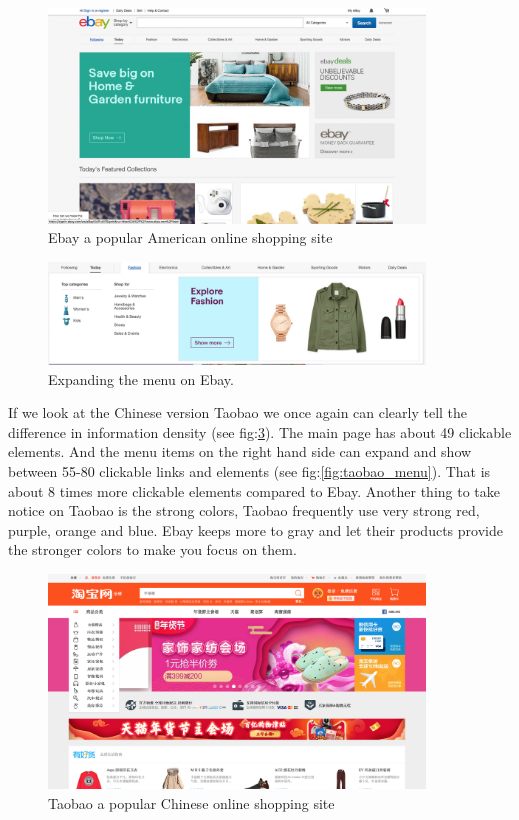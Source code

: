 \begin{figure}[h]
\centering
\includegraphics[width=100mm]{Images/ebay.png}
\decoRule
\caption[ebay]{Ebay a popular American online shopping site}
\label{fig:ebay}
\end{figure}

\begin{figure}[h]
\centering
\includegraphics[width=100mm]{Images/ebay_menu.png}
\decoRule
\caption[Ebay's menu bar]{Expanding the menu on Ebay.}
\label{fig:ebay_menu}
\end{figure}

If we look at the Chinese version Taobao we once again can clearly tell the difference in information density (see fig:\ref{fig:taobao}). The main page has about 49 clickable elements. And the menu items on the right hand side can expand and show between 55-80 clickable links and elements (see fig:\ref{fig:taobao_menu}). That is about 8 times more clickable elements compared to Ebay. Another thing to take notice on Taobao is the strong colors, Taobao frequently use very strong red, purple, orange and blue. Ebay keeps more to gray and let their products provide the stronger colors to make you focus on them. 

\begin{figure}[h]
\centering
\includegraphics[width=100mm]{Images/Taobao}
\decoRule
\caption[Taobao]{Taobao a popular Chinese online shopping site}
\label{fig:taobao}
\end{figure}

